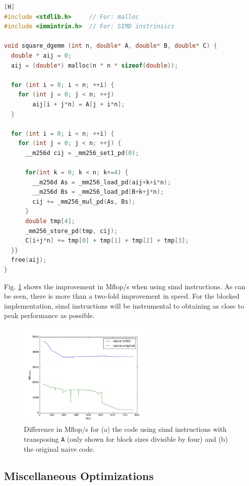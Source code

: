 \documentclass[10pt]{article}
\begin{document}
\begin{lstlisting}[language=C, basicstyle=\small][H]
#include <stdlib.h>     // For: malloc
#include <immintrin.h>  // For: SIMD instrinsics

void square_dgemm (int n, double* A, double* B, double* C) {
  double * aij = 0;
  aij = (double*) malloc(n * n * sizeof(double));

  for (int i = 0; i < n; ++i) {
    for (int j = 0; j < n; ++j)
        aij[i + j*n] = A[j + i*n];
  }

  for (int i = 0; i < n; ++i) {
    for (int j = 0; j < n; ++j) {
      __m256d cij = _mm256_set1_pd(0);
      
      for(int k = 0; k < n; k+=4) {
        __m256d As = _mm256_load_pd(aij+k+i*n);
        __m256d Bs = _mm256_load_pd(B+k+j*n);
        cij += _mm256_mul_pd(As, Bs);
      }
      double tmp[4];
      _mm256_store_pd(tmp, cij);
      C[i+j*n] += tmp[0] + tmp[1] + tmp[2] + tmp[3];
  }}
  free(aij);
}
\end{lstlisting}

Fig. \ref{fig:6} shows the improvement in Mflop/s when using \gls{simd} instructions. As can be seen, there is more than a two-fold improvement in speed. For the blocked implementation, \gls{simd} instructions will be instrumental to obtaining as close to peak performance as possible. 

\begin{figure}[H]
\centering
\includegraphics[width=0.6\textwidth]{figures/naive-original.png}
\caption{Difference in Mflop/s for (a) the code using \gls{simd} instructions with transposing {\tt A} (only shown for block sizes divisible by four) and (b) the original naive code.}
\label{fig:6}
\end{figure}

\subsection{Miscellaneous Optimizations}
\end{document}
